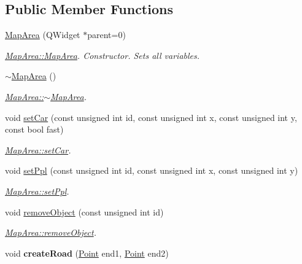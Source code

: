 \subsection*{Public Member Functions}
\begin{DoxyCompactItemize}
\item 
\hyperlink{classMapArea_aa1d27adefb4286cbb63b095e45fd0da1}{Map\-Area} (Q\-Widget $\ast$parent=0)
\begin{DoxyCompactList}\small\item\em \hyperlink{classMapArea_aa1d27adefb4286cbb63b095e45fd0da1}{Map\-Area\-::\-Map\-Area}. Constructor. Sets all variables. \end{DoxyCompactList}\item 
\hyperlink{classMapArea_a152c1aef862f93dd421b9026adf31e55}{$\sim$\-Map\-Area} ()
\begin{DoxyCompactList}\small\item\em \hyperlink{classMapArea_a152c1aef862f93dd421b9026adf31e55}{Map\-Area\-::$\sim$\-Map\-Area}. \end{DoxyCompactList}\item 
void \hyperlink{classMapArea_a00e8f999f6b70df9ef14c008b53847a4}{set\-Car} (const unsigned int id, const unsigned int x, const unsigned int y, const bool fast)
\begin{DoxyCompactList}\small\item\em \hyperlink{classMapArea_a00e8f999f6b70df9ef14c008b53847a4}{Map\-Area\-::set\-Car}. \end{DoxyCompactList}\item 
void \hyperlink{classMapArea_aa8d4d168a443d9e209aa4c689f87b877}{set\-Ppl} (const unsigned int id, const unsigned int x, const unsigned int y)
\begin{DoxyCompactList}\small\item\em \hyperlink{classMapArea_aa8d4d168a443d9e209aa4c689f87b877}{Map\-Area\-::set\-Ppl}. \end{DoxyCompactList}\item 
void \hyperlink{classMapArea_a801312b76510e621be21e1afdf4c7941}{remove\-Object} (const unsigned int id)
\begin{DoxyCompactList}\small\item\em \hyperlink{classMapArea_a801312b76510e621be21e1afdf4c7941}{Map\-Area\-::remove\-Object}. \end{DoxyCompactList}\item 
\hypertarget{classMapArea_a1904534216c0232380154ff88772cfe1}{void {\bfseries create\-Road} (\hyperlink{classPoint}{Point} end1, \hyperlink{classPoint}{Point} end2)}\label{classMapArea_a1904534216c0232380154ff88772cfe1}


\end{DoxyCompactItemize}
